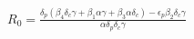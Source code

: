 \documentclass[preview]{standalone}
\begin{document}
\begin{center}
$R_0 = \frac{\delta_p (\beta_4 \delta_c \gamma + \beta_1 \alpha \gamma + \beta_3 \alpha \delta_c) - \epsilon_p \beta_2 \delta_c \gamma}{\alpha \delta_p \delta_c \gamma}$
\end{center}
\end{document}

